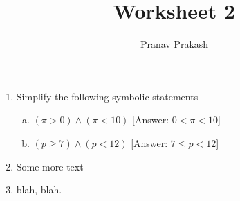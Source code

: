 \documentclass[]{article}
\begin{document}
\title{Worksheet 2}
\author{Pranav Prakash}
\maketitle


\begin{enumerate}
  \item Simplify the following symbolic statements
  \begin{enumerate}[(a)]
  	\item $(\pi > 0) \wedge (\pi < 10)$ \hfill [Answer: $0 < \pi < 10$]
  	\item $(p \geq 7) \wedge (p < 12)$ \hfill [Answer: $7 \leq p < 12$]
  \end{enumerate}
  \item Some more text
  \item blah, blah.
\end{enumerate}
\end{document}
